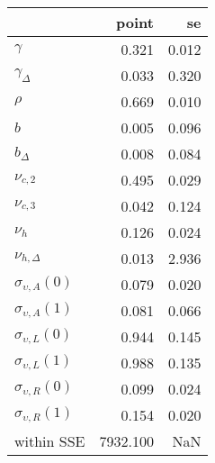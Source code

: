 \begin{tabular}{lrr}
\toprule
{} &     point &     se \\
\midrule
$\gamma$                 &     0.321 &  0.012 \\
$\gamma_{\Delta}$        &     0.033 &  0.320 \\
$\rho$                   &     0.669 &  0.010 \\
$b$                      &     0.005 &  0.096 \\
$b_{\Delta}$             &     0.008 &  0.084 \\
$\nu_{c,2}$              &     0.495 &  0.029 \\
$\nu_{c,3}$              &     0.042 &  0.124 \\
$\nu_{h}$                &     0.126 &  0.024 \\
$\nu_{h,\Delta}$         &     0.013 &  2.936 \\
$\sigma_{\upsilon,A}(0)$ &     0.079 &  0.020 \\
$\sigma_{\upsilon,A}(1)$ &     0.081 &  0.066 \\
$\sigma_{\upsilon,L}(0)$ &     0.944 &  0.145 \\
$\sigma_{\upsilon,L}(1)$ &     0.988 &  0.135 \\
$\sigma_{\upsilon,R}(0)$ &     0.099 &  0.024 \\
$\sigma_{\upsilon,R}(1)$ &     0.154 &  0.020 \\
within SSE               &  7932.100 &    NaN \\
\bottomrule
\end{tabular}
